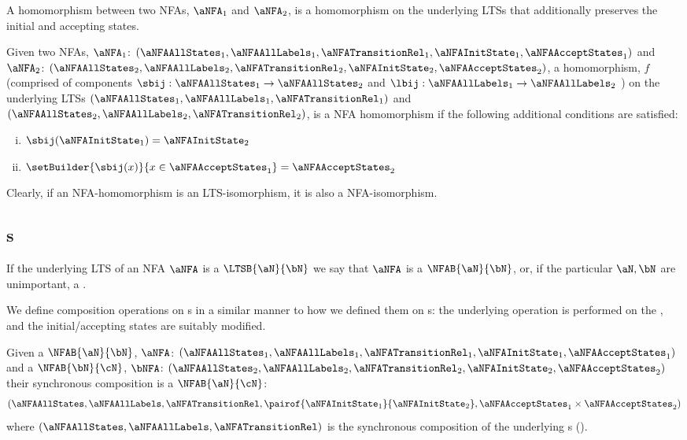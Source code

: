 A homomorphism between two NFAs, $\aNFA_1$ and $\aNFA_2$, is a homomorphism on
the underlying LTSs that additionally preserves the initial and accepting
states.

\begin{definition}
    Given two NFAs, $\aNFA_1$:
    \(
        ( \aNFAAllStates_1
        , \aNFAAllLabels_1
        , \aNFATransitionRel_1
        , \aNFAInitState_1
        , \aNFAAcceptStates_1
        )
    \) and $\aNFA_2$:
    \(
        ( \aNFAAllStates_2
        , \aNFAAllLabels_2
        , \aNFATransitionRel_2
        , \aNFAInitState_2
        , \aNFAAcceptStates_2
        )
        \), a homomorphism, $f$ (comprised of components
        $\sbij : \aNFAAllStates_1 \to \aNFAAllStates_2$ and $\lbij :
        \aNFAAllLabels_1 \to \aNFAAllLabels_2$ ) on the underlying LTSs $(
        \aNFAAllStates_1, \aNFAAllLabels_1, \aNFATransitionRel_1)$ and
        $(\aNFAAllStates_2, \aNFAAllLabels_2, \aNFATransitionRel_2)$, is a NFA
        homomorphism if the following additional conditions are satisfied:
    \begin{enumerate}[(i)]
        \item $\sbij(\aNFAInitState_1) = \aNFAInitState_2$
        \item $\setBuilder{\sbij(x)}{x \in \aNFAAcceptStates_1} =
            \aNFAAcceptStates_2$
    \end{enumerate}
\end{definition}

Clearly, if an NFA-homomorphism is an LTS-isomorphism, it is also a
NFA-isomorphism.

\subsection{\TNFA{}s} \label{sec:TNFA}

If the underlying LTS of an NFA $\aNFA$ is a $\LTSB{\aN}{\bN}$ we say that
$\aNFA$ is a $\NFAB{\aN}{\bN}$, or, if the particular $\aN, \bN$ are
unimportant, a \TNFA{}.

We define composition operations on \TNFA{}s in a similar manner to how we
defined them on \TLTS{}s: the underlying operation is performed on the \TLTS,
and the initial/accepting states are suitably modified.

\begin{definition}
\label{defn:sequentialCompositionTNFA}
    Given a $\NFAB{\aN}{\bN}$, $\aNFA$:
    $( \aNFAAllStates_1
     , \aNFAAllLabels_1
     , \aNFATransitionRel_1
     , \aNFAInitState_1
     , \aNFAAcceptStates_1
     )$ and a $\NFAB{\bN}{\cN}$, $\bNFA$:
    $( \aNFAAllStates_2
     , \aNFAAllLabels_2
     , \aNFATransitionRel_2
     , \aNFAInitState_2
     , \aNFAAcceptStates_2
     )$ their synchronous composition is a $\NFAB{\aN}{\cN}$:
    \[( \aNFAAllStates
     , \aNFAAllLabels
     , \aNFATransitionRel
     , \pairof{\aNFAInitState_1}{\aNFAInitState_2}
     , \aNFAAcceptStates_1 \times \aNFAAcceptStates_2
 )\] where
    $( \aNFAAllStates
     , \aNFAAllLabels
     , \aNFATransitionRel)$ is the synchronous composition of the underlying
     \TLTS{}s ().
\end{definition}

